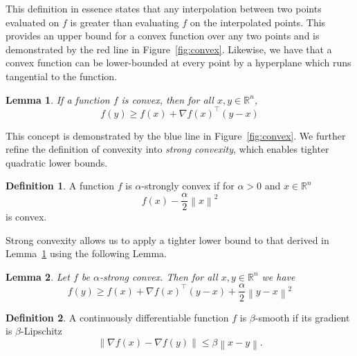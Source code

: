 \documentclass{article}
\newcommand{\R}{\mathbb R}
\newcommand{\norm}[1]{\left\| #1 \right\| }
\newtheorem{lemma}{Lemma}
\theoremstyle{definition}
\newtheorem{definition}{Definition}
\begin{document}
This definition in essence states that any interpolation between two points
evaluated on $f$ is greater than evaluating $f$ on the interpolated points. This
provides an upper bound for a convex function over any two points and is
demonstrated by the red line in Figure~\ref{fig:convex}. Likewise, we
have that a convex function can be lower-bounded at every point by a hyperplane
which runs tangential to the function.

\begin{lemma}
    \label{lem:convex_bound}
    If a function $f$ is convex, then for all $x, y \in \R^n$,
    \begin{equation}
        f(y) \geq f(x) + \nabla {f(x)}^\intercal (y - x)
    \end{equation}
\end{lemma}

This concept is demonstrated by the blue line in Figure~\ref{fig:convex}. We
further refine the definition of convexity into \emph{strong convexity}, which
enables tighter quadratic lower bounds.

\begin{definition}
    A function $f$ is $\alpha$-strongly convex if for $\alpha > 0$ and $x \in
    \R^n$
    \begin{equation}
        f(x) - \frac{\alpha}{2}\norm{x}^2   
    \end{equation}
    is convex.
\end{definition}

Strong convexity allows us to apply a tighter lower bound to that derived in
Lemma~\ref{lem:convex_bound} using the following Lemma.

\begin{lemma}
    Let $f$ be $\alpha$-strong convex. Then for all $x, y \in \R^n$ we have 
    \begin{equation}
        f(y) \geq f(x) + \nabla {f(x)}^\intercal(y - x) + \frac{\alpha}{2}
        \norm{y - x}^2
    \end{equation}
\end{lemma}

\begin{definition}
    A continuously differentiable function $f$ is $\beta$-smooth if its gradient
    is $\beta$-Lipschitz
    \begin{equation}
        \norm{\nabla f(x) - \nabla f(y)} \leq \beta \norm{x - y}.
    \end{equation}
\end{definition}
\end{document}
